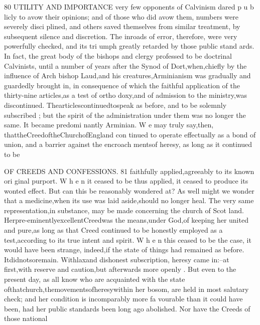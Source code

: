 \documentclass[
]{book}
\begin{document}
80 UTILITY AND IMPORTANCE
very few opponents of Calvinism dared p u b licly to avow their opinions; and of those who
did avow them, numbers were severely disci plined, and others saved themselves from
similar treatment, by subsequent silence and discretion. The inroads of error, therefore,
were very powerfully checked, and its tri
umph greatly retarded by those public stand
ards. In fact, the great body of the bishops
and clergy professed to be doctrinal Calvinists,
until a number of years after the Synod of Dort,when,chiefly by the influence of Arch
bishop Laud,and his creatures,Arminianism was gradually and guardedly brought in, in consequence of which the faithful application
of the thirty-nine articles,as a test of ortho doxy,and of admission to the ministry,was discontinued. Thearticlescontinuedtospeak
as before, and to be solemnly subscribed ; but the spirit of the administration under them was no longer the same. It became predomi nantly Arminian. W e may truly say,then, thattheCreedoftheChurchofEngland con
tinued to operate effectually as a bond of union, and a barrier against the encroach mentsof heresy, as long as it continued to be

OF CREEDS AND CONFESSIONS. 81
faithfully applied,agreeably to its known ori ginal purport. W h e n it ceased to be thus applied, it ceased to produce its wonted effect. But can this be reasonably wondered at? As well might we wonder that a medicine,when its use was laid aside,should no longer heal.
The very same representation,in substance, may be made concerning the church of Scot land. Herpre-eminentlyexcellentCreedwas
the means,under God,of keeping her united
and pure,as long as that Creed continued to
be honestly employed as a test,according to
its true intent and spirit. W h e n this ceased to be the case, it would have been strange,
indeed,if the state of things had remained as before. Itdidnotsoremain. Withlaxand
dishonest subscription, heresy came in:--at first,with reserve and caution,but afterwards more openly . But even to the present day, as all know who are acquainted with the state ofthatchurch,themovementsofheresywithin her bosom, are held in most salutary check; and her condition is incomparably more fa vourable than it could have been, had her public standards been long ago abolished.
Nor have the Creeds of those national
\end{document}
